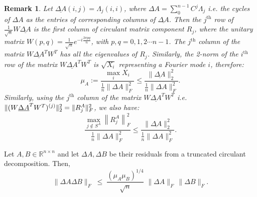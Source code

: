 \documentclass[onefignum,onetabnum]{siamart171218}
\newtheorem{Remark}[theorem]{Remark}
\newcommand{\normF}[1]{\left\|#1\right\|_F}
\DeclarePairedDelimiter\norm{\lVert}{\rVert}
\begin{document}
\begin{Remark}\label{rem:Xi}
Let $\underline{\Delta A}(i,j) = \Lambda_j(i,i)$, where $\Delta A=\sum_0^{n-1}C^j\Lambda_j$ i.e. the cycles of $\Delta A$ as the entries of corresponding columns of $\underline{\Delta A}$. Then the $j^{\text{th}}$ row of $\frac{1}{\sqrt{n}} W \underline{\Delta A}$ is the first column of circulant matrix 
component $R_j$, where the unitary matrix $W(p,q) = \frac{1}{\sqrt{n}}e^{-i \frac{2\pi pq}{n}}$, with $p,q=0,1,2\cdots n-1$. The $j^{\text{th}}$ column of the matrix $W\underline{\Delta A}^TW^T$ has all the eigenvalues of $R_j$. Similarly, the 2-norm of the $i^{\text{th}}$ row of the matrix $W \underline{\Delta A}^T W^T$ is $\sqrt{X_i}$ representing a Fourier mode $i$, therefore:
\[\mu_A := \frac{\max_i X_i}{\frac{1}{n}\|\Delta A\|_F^2 } \leq \frac{\|\underline{\Delta A}\|^2_2}{\frac{1}{n}\|\Delta A\|_F^2}.\] Similarly, using the $j^{\text{th}}$ column of the matrix $W \underline{\Delta A}^T W^T$ i.e.  $\norm{(W \underline{\Delta A}^T W^T)^{(j)}}_2^2=\norm{R_j^A}_F^2$, we also have:
     \[ \frac{\max_{j \notin S^A} \normF{R_j^A}^2}{\frac{1}{n}\|\Delta A\|_F^2 } \leq \frac{\|\underline{\Delta A}\|^2_2}{\frac{1}{n}\|\Delta A\|_F^2}.\] 
\end{Remark}

\begin{theorem}
\label{th:cd-deterministic}
Let $A, B \in \mathbb{R}^{n \times n}$ and let $\Delta A, \Delta B$ be their residuals from a truncated circulant decomposition. Then,
\[
\|\Delta A \Delta B\|_F
\;\le\;
\frac{(\mu_A \mu_B)^{1/4}}{\sqrt{n}}\;
\|\Delta A\|_F \, \|\Delta B\|_F.
\]
\end{theorem}
\end{document}
